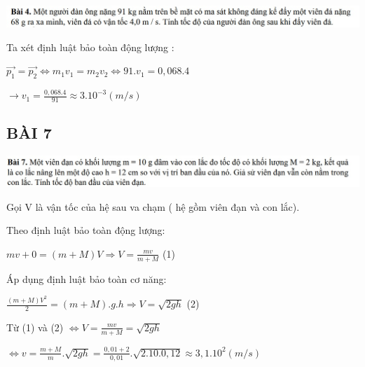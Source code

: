 \documentclass[12pt,a4paper]{article}
\begin{document}
\vspace*{1cm}
\includegraphics[scale=0.80]{No4.jpg}

\vspace*{1cm}
Ta xét định luật bảo toàn động lượng : 

\vspace*{1cm}
$\vec{p_1} =\vec{p_2} \Leftrightarrow m_1v_1 = m_2v_2 \Leftrightarrow 91.v_1 = 0,068.4$

\vspace*{1cm}
$\rightarrow v_1 = \frac{0,068.4}{91} \approx 3.10^{-3} (m/s)$

\vspace*{1cm}
\Large \subsection{\color{blue}\textbf{BÀI 7} }
\includegraphics[scale=0.80]{No7.jpg}

\vspace*{1cm}
Gọi V là vận tốc của hệ sau va chạm ( hệ gồm viên đạn và con lắc).

Theo định luật bảo toàn động lượng:

\vspace*{1cm}
$mv + 0 = (m + M)V \Rightarrow V = \frac{mv}{m + M} $ (1)

\vspace*{1cm}
Áp dụng định luật bảo toàn cơ năng: 

\vspace*{1cm}
$ \frac{(m + M)V^2}{2} = (m + M).g.h \Rightarrow V = \sqrt{2gh}$ (2)

\vspace*{1cm}
Từ (1) và (2) $\Leftrightarrow V = \frac{mv}{m + M} = \sqrt{2gh}$

\vspace*{1cm}
$\Leftrightarrow v = \frac{m + M}{m}. \sqrt{2gh} = \frac{0,01 + 2}{0,01} . \sqrt{2.10.0,12} \approx 3,1 . 10^2 (m/s)$
\end{document}
